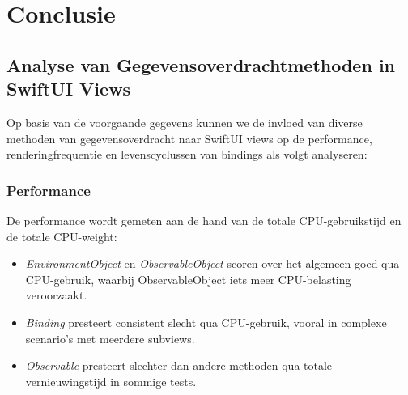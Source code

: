
\chapter{Conclusie}%
\label{ch:conclusie}



\section{Analyse van Gegevensoverdrachtmethoden in SwiftUI Views}
Op basis van de voorgaande gegevens kunnen we de invloed van diverse methoden van gegevensoverdracht naar SwiftUI views op de performance, renderingfrequentie en levenscyclussen van bindings als volgt analyseren:

\subsection{Performance}
De performance wordt gemeten aan de hand van de totale CPU-gebruikstijd en de totale CPU-weight:
\begin{itemize}
    \item \textit{EnvironmentObject} en \textit{ObservableObject} scoren over het algemeen goed qua CPU-gebruik, waarbij ObservableObject iets meer CPU-belasting veroorzaakt.
    \item \textit{Binding} presteert consistent slecht qua CPU-gebruik, vooral in complexe scenario's met meerdere subviews.
    \item \textit{Observable} presteert slechter dan andere methoden qua totale vernieuwingstijd in sommige tests.
\end{itemize}

